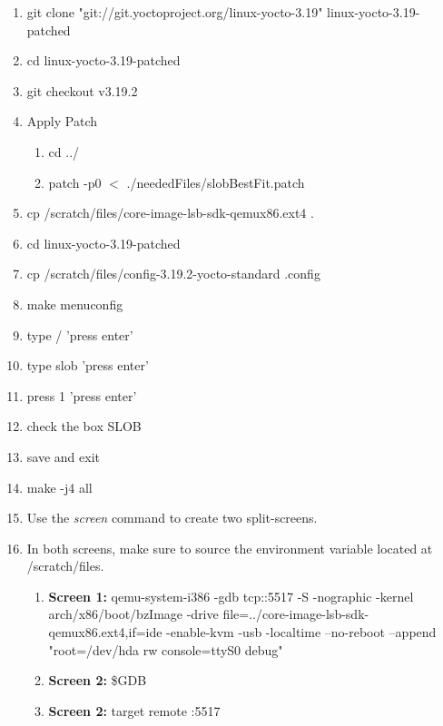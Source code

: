 \documentclass[draftclsnofoot, onecolumn, 10pt, compsoc]{IEEEtran}
\begin{document}
			\begin{enumerate}
				\item git clone "git://git.yoctoproject.org/linux-yocto-3.19" linux-yocto-3.19-patched
				
				\item cd linux-yocto-3.19-patched
				
				\item git checkout v3.19.2
				
				\item Apply Patch
				\begin{enumerate}
					\item cd ../
					\item patch -p0 $<$ ./neededFiles/slobBestFit.patch
				\end{enumerate}
				
				\item cp /scratch/files/core-image-lsb-sdk-qemux86.ext4 .
				\item cd linux-yocto-3.19-patched
				\item cp /scratch/files/config-3.19.2-yocto-standard .config
				\item make menuconfig
				
				\item type / 'press enter'
				\item type slob 'press enter'
				\item press 1 'press enter'
				\item check the box SLOB
				\item save and exit
				
				\item make -j4 all
				
				\item Use the \textit{screen} command to create two split-screens.
				
				\item In both screens, make sure to source the environment variable located at /scratch/files.
				\begin{enumerate}
					\item{\textbf{Screen 1:} qemu-system-i386 -gdb tcp::5517 -S -nographic -kernel arch/x86/boot/bzImage -drive file=../core-image-lsb-sdk-qemux86.ext4,if=ide -enable-kvm -usb -localtime --no-reboot --append "root=/dev/hda rw console=ttyS0 debug"}
					
					\item \textbf{Screen 2:} \$GDB
					
					\item \textbf{Screen 2:} target remote :5517
					

\end{enumerate}
\end{enumerate}
\end{document}
